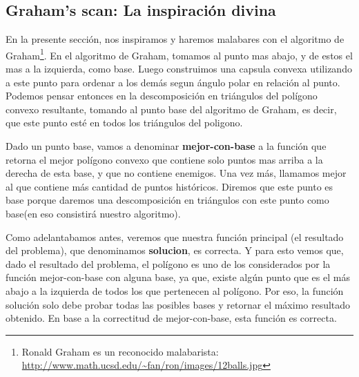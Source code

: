 \subsection{Graham's scan: La inspiración divina}
\par{En la presente sección, nos inspiramos y haremos malabares con el algoritmo de Graham\footnote{Ronald Graham es un reconocido malabarista: \url{http://www.math.ucsd.edu/~fan/ron/images/12balls.jpg}}.
En el algoritmo de Graham, tomamos al punto mas abajo, y de estos el mas a la izquierda, como base. Luego construimos una capsula convexa utilizando a este punto para ordenar a los demás segun ángulo polar en relación al punto. Podemos pensar entonces en la descomposición en triángulos del polígono convexo resultante, tomando al punto base del algoritmo de Graham, es decir, que este punto esté en todos los triángulos del poligono.}

\par{Dado un punto base, vamos a denominar \textbf{mejor-con-base} a la función que retorna el mejor polígono convexo que contiene solo puntos mas arriba a la derecha de esta base, y que no contiene enemigos. Una vez más, llamamos mejor al que contiene más cantidad de puntos históricos. Diremos que este punto es base porque daremos una descomposición en triángulos con este punto como base(en eso consistirá nuestro algoritmo).}
\par{Como adelantabamos antes, veremos que nuestra función principal (el resultado del problema), que denominamos \textbf{solucion}, es correcta. Y para esto vemos que, dado el resultado del problema, el polígono es uno de los considerados por la función mejor-con-base con alguna base, ya que, existe algún punto que es el más abajo a la izquierda de todos los que pertenecen al polígono. Por eso, la función solución solo debe probar todas las posibles bases y retornar el máximo resultado obtenido. En base a la correctitud de mejor-con-base, esta función es correcta.}

